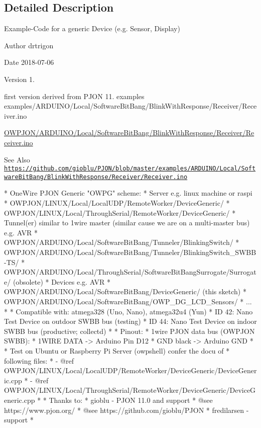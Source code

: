 \subsection{Detailed Description}
Example-\/\-Code for a generic Device (e.\-g. Sensor, Display) \begin{DoxyAuthor}{Author}
drtrigon 
\end{DoxyAuthor}
\begin{DoxyDate}{Date}
2018-\/07-\/06 
\end{DoxyDate}
\begin{DoxyVersion}{Version}
1. \begin{DoxyItemize}
\item first version derived from P\-J\-O\-N 11. examples examples/\-A\-R\-D\-U\-I\-N\-O/\-Local/\-Software\-Bit\-Bang/\-Blink\-With\-Response/\-Receiver/\-Receiver.\-ino\end{DoxyItemize}
\hyperlink{SoftwareBitBang_2BlinkWithResponse_2Receiver_2Receiver_8ino}{O\-W\-P\-J\-O\-N/\-A\-R\-D\-U\-I\-N\-O/\-Local/\-Software\-Bit\-Bang/\-Blink\-With\-Response/\-Receiver/\-Receiver.\-ino} 
\end{DoxyVersion}
\begin{DoxySeeAlso}{See Also}
\href{https://github.com/gioblu/PJON/blob/master/examples/ARDUINO/Local/SoftwareBitBang/BlinkWithResponse/Receiver/Receiver.ino}{\tt https\-://github.\-com/gioblu/\-P\-J\-O\-N/blob/master/examples/\-A\-R\-D\-U\-I\-N\-O/\-Local/\-Software\-Bit\-Bang/\-Blink\-With\-Response/\-Receiver/\-Receiver.\-ino}
\end{DoxySeeAlso}
\begin{DoxyVerb}* OneWire PJON Generic "OWPG" scheme:
*   Server e.g. linux machine or raspi
*      OWPJON/LINUX/Local/LocalUDP/RemoteWorker/DeviceGeneric/
*      OWPJON/LINUX/Local/ThroughSerial/RemoteWorker/DeviceGeneric/
*   Tunnel(er) similar to 1wire master (similar cause we are on a multi-master bus) e.g. AVR
*      OWPJON/ARDUINO/Local/SoftwareBitBang/Tunneler/BlinkingSwitch/
*      OWPJON/ARDUINO/Local/SoftwareBitBang/Tunneler/BlinkingSwitch_SWBB-TS/
*      OWPJON/ARDUINO/Local/ThroughSerial/SoftwareBitBangSurrogate/Surrogate/ (obsolete)
*   Devices e.g. AVR
*      OWPJON/ARDUINO/Local/SoftwareBitBang/DeviceGeneric/ (this sketch)
*      OWPJON/ARDUINO/Local/SoftwareBitBang/OWP_DG_LCD_Sensors/
*      ...
*
* Compatible with: atmega328 (Uno, Nano), atmega32u4 (Yun)
*   ID 42: Nano Test Device on outdoor SWBB bus (testing)
*   ID 44: Nano Test Device on indoor SWBB bus (productive; collectd)
*
* Pinout:
*   1wire PJON data bus (OWPJON SWBB):
*        1WIRE DATA    -> Arduino Pin D12
*        GND black     -> Arduino GND
*
* Test on Ubuntu or Raspberry Pi Server (owpshell) confer the docu of
* following files:
*   - @ref OWPJON/LINUX/Local/LocalUDP/RemoteWorker/DeviceGeneric/DeviceGeneric.cpp
*   - @ref OWPJON/LINUX/Local/ThroughSerial/RemoteWorker/DeviceGeneric/DeviceGeneric.cpp
*
* Thanks to:
* gioblu - PJON 11.0 and support
*          @see https://www.pjon.org/
*          @see https://github.com/gioblu/PJON
* fredilarsen - support
* \end{DoxyVerb}
 

